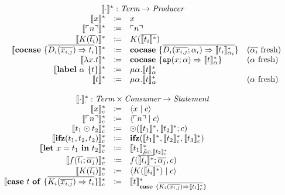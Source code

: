 \[
  \begin{array}{rcll}
    \multicolumn{4}{c}{\translatestar{\cdot}{} : \emph{Term} \rightarrow  \emph{Producer}}\\
    \translatestar{x}{} & \coloneqq & x & \\
    \translatestar{\lit{n}}{} & \coloneqq & \lit{n} & \\
    \translatestar{K(\overline{t_i})}{} & \coloneqq & K(\overline{\translatestar{t_i}{}}) & \\
    \translatestar{\cocase{\overline{D_i(\overline{x_{i,j}}) \Rightarrow t_i}}}{} & \coloneq & \cocase{\overline{D_i(\overline{x_{i,j}}; \alpha_i) \Rightarrow \translatestar{t_i}{\alpha_i}}} & \fresh{\overline{\alpha_i}} \\
    \translatestar{\lambda x.t}{} & \coloneq & \cocase{\mathtt{ap}(x; \alpha) \Rightarrow \translatestar{t}{\alpha}} & \fresh{\alpha} \\
    \translatestar{\lab{\alpha}{t}}{} & \coloneq & \mu \alpha.\translatestar{t}{\alpha}{} & \\
    \translatestar{t}{} & \coloneqq & \mu\alpha.\translatestar{t}{\alpha} & \fresh{\alpha}\\
    \\
    \multicolumn{4}{c}{\translatestar{\cdot}{\cdot} : \emph{Term} \times \emph{Consumer} \rightarrow \emph{Statement}}\\
    \translatestar{x}{c} & \coloneq & \cut{x}{c} & \\
    \translatestar{\lit{n}}{c} & \coloneq & \cut{\lit{n}}{c} & \\
    \translatestar{t_1 \odot t_2}{c} & \coloneq & \odot(\translatestar{t_1}{}, \translatestar{t_2}{}; c) & \\
    \translatestar{\ifz{t_1}{t_2}{t_2}}{c} & \coloneq & \ifz{\translatestar{t_1}{}}{\translatestar{t_2}{c}}{\translatestar{t_3}{c}} & \\
    \translatestar{\letin{x}{t_1}{t_2}}{c} & \coloneq & \translatestar{t_1}{\tilde{\mu}x.\translatestar{t_2}{c}} & \\
    \translatestar{f(\overline{t_i}; \overline{\alpha_j})}{c} & \coloneq & f(\overline{\translatestar{t_i}{}}; \overline{\alpha_j}, c) & \\
    \translatestar{K(\overline{t_i})}{c} & \coloneq & \cut{K(\overline{\translatestar{t_i}{}})}{c} & \\
    \translatestar{\caseof{t}{\overline{K_i(\overline{x_{i,j}}) \Rightarrow t_i}}}{c} & \coloneq & \translatestar{t}{\case{\overline{K_i(\overline{x_{i,j}}) \Rightarrow \translatestar{t_i}{c}}}} & \\

\end{array}\]
